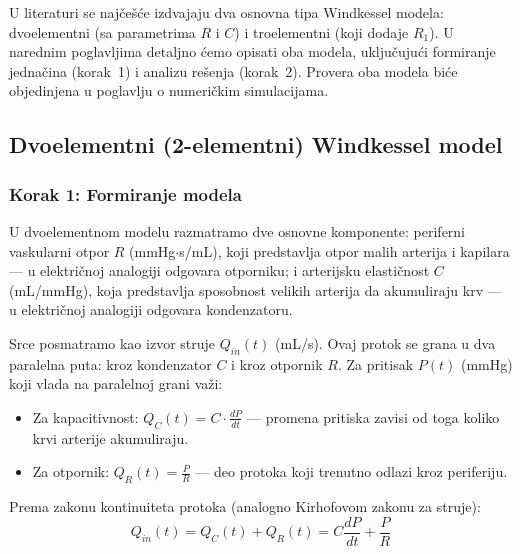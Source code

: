 \documentclass[12pt,a4paper]{article}
\begin{document}
U literaturi se najčešće izdvajaju dva osnovna tipa Windkessel modela: dvoelementni (sa parametrima $R$ i $C$) i troelementni (koji dodaje $R_1$). U narednim poglavljima detaljno ćemo opisati oba modela, uključujući formiranje jednačina (korak~1) i analizu rešenja (korak~2). Provera oba modela biće objedinjena u poglavlju o numeričkim simulacijama.


\subsection{Dvoelementni (2-elementni) Windkessel model}

\subsubsection{Korak 1: Formiranje modela}

U dvoelementnom modelu razmatramo dve osnovne komponente: periferni vaskularni otpor $R$ (mmHg$\cdot$s/mL), koji predstavlja otpor malih arterija i kapilara --- u električnoj analogiji odgovara otporniku; i arterijsku elastičnost $C$ (mL/mmHg), koja predstavlja sposobnost velikih arterija da akumuliraju krv --- u električnoj analogiji odgovara kondenzatoru.


Srce posmatramo kao izvor struje $Q_{in}(t)$ (mL/s). Ovaj protok se grana u dva paralelna puta: kroz kondenzator $C$ i kroz otpornik $R$. Za pritisak $P(t)$ (mmHg) koji vlada na paralelnoj grani važi:

\begin{itemize}
    \item Za kapacitivnost: $Q_C(t) = C \cdot \frac{dP}{dt}$ --- promena pritiska zavisi od toga koliko krvi arterije akumuliraju.
    \item Za otpornik: $Q_R(t) = \frac{P}{R}$ --- deo protoka koji trenutno odlazi kroz periferiju.
\end{itemize}

Prema zakonu kontinuiteta protoka (analogno Kirhofovom zakonu za struje):
\begin{equation}
    Q_{in}(t) = Q_C(t) + Q_R(t) = C \frac{dP}{dt} + \frac{P}{R}
    \label{eq:2elem_basic}
\end{equation}
\end{document}
